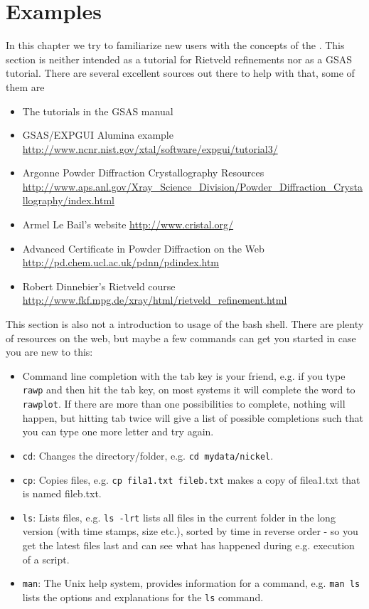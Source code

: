 \chapter{Examples}

In this chapter we try to familiarize new users with the concepts of the \gl. This section is neither intended as a tutorial for Rietveld refinements nor as a GSAS tutorial. There are several excellent sources out there to help with that, some of them are
\begin{itemize}
\item The tutorials in the GSAS manual
\item GSAS/EXPGUI Alumina example \url{http://www.ncnr.nist.gov/xtal/software/expgui/tutorial3/}
\item Argonne Powder Diffraction Crystallography Resources \url{http://www.aps.anl.gov/Xray_Science_Division/Powder_Diffraction_Crystallography/index.html}
\item Armel Le Bail's website \url{http://www.cristal.org/}
\item Advanced Certificate in Powder Diffraction on the Web \url{http://pd.chem.ucl.ac.uk/pdnn/pdindex.htm}
\item Robert Dinnebier's Rietveld course \url{http://www.fkf.mpg.de/xray/html/rietveld_refinement.html}
\end{itemize}
This section is also not a introduction to usage of the bash shell. There are plenty of resources on the web, but maybe a few commands can get you started in case you are new to this:
\begin{itemize}
\item Command line completion with the tab key is your friend, e.g. if you type \texttt{rawp} and then hit the tab key, on most systems it will complete the word to \texttt{rawplot}. If there are more than one possibilities to complete, nothing will happen, but hitting tab twice will give a list of possible completions such that you can type one more letter and try again.
\item \texttt{cd}: Changes the directory/folder, e.g. \texttt{cd mydata/nickel}. 
\item \texttt{cp}: Copies files, e.g. \texttt{cp fila1.txt fileb.txt} makes a copy of filea1.txt that is named fileb.txt. 
\item \texttt{ls}: Lists files, e.g. \texttt{ls -lrt} lists all files in the current folder in the long version (with time stamps, size etc.), sorted by time in reverse order - so you get the latest files last and can see what has happened during e.g. execution of a script. 
\item \texttt{man}: The Unix help system, provides information for a command, e.g. \texttt{man ls} lists the options and explanations for the \texttt{ls} command. 
\end{itemize}

